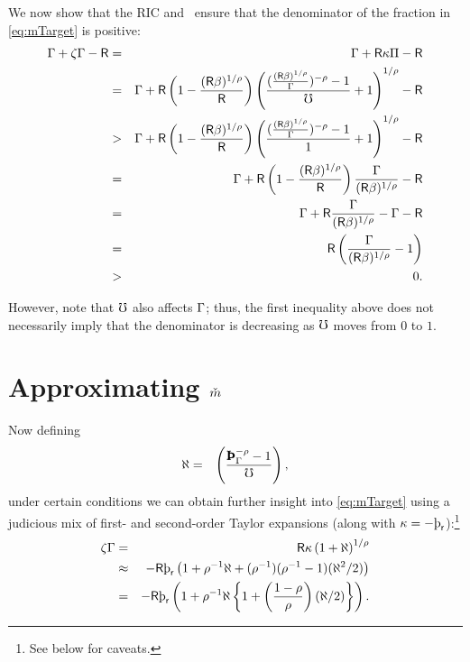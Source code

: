 \documentclass{handout}
\begin{document}
We now show that the RIC and \GICPGro~ensure that the denominator of the fraction in \eqref{eq:mTarget} is positive: 
\begin{eqnarray*}
\Gamma + \zeta \Gamma - \mathsf{R} & = & \Gamma + \mathsf{R} \kappa \Pi - \mathsf{R}
 \\& = & \Gamma + \mathsf{R} \left(1- \frac{(\mathsf{R} \beta)^{1/\rho}}{\mathsf{R}}\right) \left(\frac{(\frac{(\mathsf{R}\beta)^{1/\rho}}{\Gamma})^{-\rho}-1}{\mho}+1\right)^{1/\rho}-\mathsf{R}
 \\& > &  \Gamma+\mathsf{R} \left(1-\frac{(\mathsf{R}\beta)^{1/\rho}}{\mathsf{R}}\right)
\left(\frac{(\frac{(\mathsf{R}\beta)^{1/\rho}}{\Gamma})^{-\rho}-1}{1}+1\right)^{1/\rho}-\mathsf{R}
 \\& = & \Gamma+\mathsf{R}\left(1-\frac{(\mathsf{R}\beta)^{1/\rho}}{\mathsf{R}}\right)\frac{\Gamma}{(\mathsf{R}\beta)^{1/\rho}}-\mathsf{R}
 \\& = & \Gamma+\mathsf{R} \frac{\Gamma}{(\mathsf{R}\beta)^{1/\rho}}- \Gamma - \mathsf{R}
 \\& = & \mathsf{R} \left(\frac{\Gamma}{(\mathsf{R}\beta)^{1/\rho}}-1\right)
 \\& > & 0.
\end{eqnarray*}

However, note that $\mho$ also affects $\Gamma$; thus, the first inequality above does
not necessarily imply that the denominator is decreasing as $\mho$ moves from $0$ to $1$.


\section{Approximating $\mTarg^{\null}$}

Now defining
\begin{eqnarray}
  \aleph & = & \left(\frac{\PatPGro^{-\CRRA} - 1}{\urate}\right),
\end{eqnarray}
under certain conditions we can obtain further insight into \eqref{eq:mTarget} using a judicious mix of first- and second-order Taylor expansions (along with $\MPCU = -\patr$):\footnote{See below for caveats.}
\begin{eqnarray}
  \label{eq:zetaExp}
  \zeta\PGro & = & \Rfree \MPCU \left(1+\aleph\right)^{1/\CRRA}
\\ & \approx & -\Rfree \patr \left(1+\CRRA^{-1}\aleph+(\CRRA^{-1})(\CRRA^{-1}-1)(\aleph^{2}/2)\right)
\\ & = & -\Rfree \patr \left(1+\CRRA^{-1}\aleph\left\{1+\left(\frac{1-\CRRA}{\CRRA}\right)(\aleph/2)\right\}\right) \label{eq:zetaTaylor2}
.
\end{eqnarray}
\end{document}
